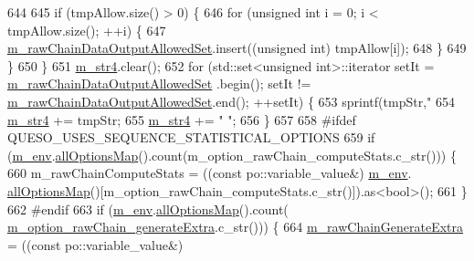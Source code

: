 \begin{DoxyCode}
{{{644 
645     \textcolor{keywordflow}{if} (tmpAllow.size() > 0) \{
646       \textcolor{keywordflow}{for} (\textcolor{keywordtype}{unsigned} \textcolor{keywordtype}{int} i = 0; i < tmpAllow.size(); ++i) \{
647         \hyperlink{class_q_u_e_s_o_1_1_m_l_sampling_level_options_ae5c2fe5b90eda78e17ccfbf3dbcfcc89}{m\_rawChainDataOutputAllowedSet}.insert((\textcolor{keywordtype}{unsigned} \textcolor{keywordtype}{int}) tmpAllow[i]);
648       \}
649     \}
650   \}
651   \hyperlink{class_q_u_e_s_o_1_1_m_l_sampling_level_options_a399d93049d7862d47c8ac68e1885d0c9}{m\_str4}.clear();
652   \textcolor{keywordflow}{for} (std::set<unsigned int>::iterator setIt = \hyperlink{class_q_u_e_s_o_1_1_m_l_sampling_level_options_ae5c2fe5b90eda78e17ccfbf3dbcfcc89}{m\_rawChainDataOutputAllowedSet}
      .begin(); setIt != \hyperlink{class_q_u_e_s_o_1_1_m_l_sampling_level_options_ae5c2fe5b90eda78e17ccfbf3dbcfcc89}{m\_rawChainDataOutputAllowedSet}.end(); ++setIt) \{
653     sprintf(tmpStr,\textcolor{stringliteral}{"%
654     \hyperlink{class_q_u_e_s_o_1_1_m_l_sampling_level_options_a399d93049d7862d47c8ac68e1885d0c9}{m\_str4} += tmpStr;
655     \hyperlink{class_q_u_e_s_o_1_1_m_l_sampling_level_options_a399d93049d7862d47c8ac68e1885d0c9}{m\_str4} += \textcolor{stringliteral}{" "};
656   \}
657 
658 \textcolor{preprocessor}{#ifdef QUESO\_USES\_SEQUENCE\_STATISTICAL\_OPTIONS}
659 \textcolor{preprocessor}{}  \textcolor{keywordflow}{if} (\hyperlink{class_q_u_e_s_o_1_1_m_l_sampling_level_options_a5bdc1fb3f6eb46f73feec9c356c9a1b8}{m\_env}.\hyperlink{class_q_u_e_s_o_1_1_base_environment_ae7cee155956e0e70112f45e2ad1f02c8}{allOptionsMap}().count(m\_option\_rawChain\_computeStats.c\_str())) \{
660     m\_rawChainComputeStats = ((\textcolor{keyword}{const} po::variable\_value&) \hyperlink{class_q_u_e_s_o_1_1_m_l_sampling_level_options_a5bdc1fb3f6eb46f73feec9c356c9a1b8}{m\_env}.
      \hyperlink{class_q_u_e_s_o_1_1_base_environment_ae7cee155956e0e70112f45e2ad1f02c8}{allOptionsMap}()[m\_option\_rawChain\_computeStats.c\_str()]).as<bool>();
661   \}
662 \textcolor{preprocessor}{#endif}
663 \textcolor{preprocessor}{}  \textcolor{keywordflow}{if} (\hyperlink{class_q_u_e_s_o_1_1_m_l_sampling_level_options_a5bdc1fb3f6eb46f73feec9c356c9a1b8}{m\_env}.\hyperlink{class_q_u_e_s_o_1_1_base_environment_ae7cee155956e0e70112f45e2ad1f02c8}{allOptionsMap}().count(
      \hyperlink{class_q_u_e_s_o_1_1_m_l_sampling_level_options_a775bb8dfb4e5f2a0069667586eb1b336}{m\_option\_rawChain\_generateExtra}.c\_str())) \{
664     \hyperlink{class_q_u_e_s_o_1_1_m_l_sampling_level_options_ab0dda87d92a759b277d07157def23174}{m\_rawChainGenerateExtra} = ((\textcolor{keyword}{const} po::variable\_value&) 
}}}}
\end{DoxyCode}
